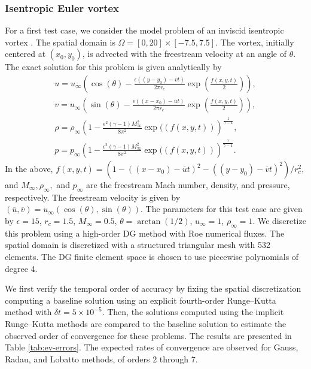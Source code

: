 \documentclass[review]{siamart}
\begin{document}
\subsubsection{Isentropic Euler vortex}
For a first test case, we consider the model problem of an inviscid isentropic
vortex \cite{Shu1998,Wang2013}. The spatial domain is $\Omega = [0,20] \times
[-7.5,7.5]$. The vortex, initially centered at $(x_0, y_0)$, is advected with
the freestream velocity at an angle of $\theta$. The exact solution for this
problem is given analytically by
\begin{gather}
\label{eq:ev-exact-1}
   u = u_\infty \left( \cos(\theta) - \frac{\epsilon ((y-y_0)
       - \overline{v} t)}{2\pi r_c}
       \exp\left( \frac{f(x,y,t)}{2} \right) \right),\\
\label{eq:ev-exact-2}
   v = u_\infty \left( \sin(\theta) - \frac{\epsilon ((x-x_0)
       - \overline{u} t)}{2\pi r_c}
       \exp\left( \frac{f(x,y,t)}{2} \right) \right),\\
\label{eq:ev-exact-3}
   \rho = \rho_\infty \left( 1 -
       \frac{\epsilon^2 (\gamma - 1)M^2_\infty}{8\pi^2} \exp((f(x,y,t))
       \right)^{\frac{1}{\gamma-1}}, \\
\label{eq:ev-exact-4}
   p = p_\infty \left( 1 -
       \frac{\epsilon^2 (\gamma - 1)M^2_\infty}{8\pi^2} \exp((f(x,y,t))
       \right)^{\frac{\gamma}{\gamma-1}}.
\end{gather}
In the above, $f(x,y,t) = (1 - ((x-x_0) - \overline{u}t)^2 - ((y-y_0) - \overline{v}t)^2)/r_c^2$, and $M_\infty, \rho_\infty,$ and $p_\infty$ are the freestream Mach number, density, and pressure, respectively.
The freestream velocity is given by $(\overline{u},\overline{v}) = u_\infty (\cos(\theta), \sin(\theta))$.
The parameters for this test case are given by $\epsilon = 15$, $r_c = 1.5$, $M_\infty = 0.5$, $\theta = \arctan(1/2)$, $u_\infty = 1$, $\rho_\infty = 1$.
We discretize this problem using a high-order DG method with Roe numerical fluxes.
The spatial domain is discretized with a structured triangular mesh with 532 elements.
The DG finite element space is chosen to use piecewise polynomials of degree 4.

We first verify the temporal order of accuracy by fixing the spatial discretization  computing a baseline solution using an explicit fourth-order Runge--Kutta method with $\delta t = 5\times 10^{-5}$.
Then, the solutions computed using the implicit Runge--Kutta methods are compared to the baseline solution to estimate the observed order of convergence for these problems.
The results are presented in Table \ref{tab:ev-errors}.
The expected rates of convergence are observed for Gauss, Radau, and Lobatto methods, of orders 2 through 7.
\end{document}
